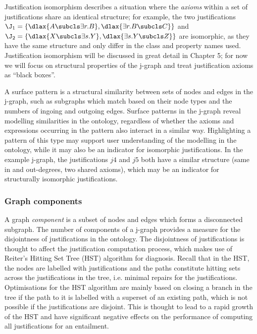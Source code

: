 Justification isomorphism \cite{horridge11gj} describes a situation where the \emph{axioms} within a set of justifications share an identical structure; for example, the two justifications $\J_{1} =\{\dlax{A \subcls \exists r.B}, \dlax{\exists r.B \subcls C}\}$ \entails {} and $\J_{2} = \{\dlax{X \subcls \exists s.Y}, \dlax{\exists s.Y \subcls Z}\}$ \entails {}  are isomorphic, as they have the same structure and only differ in the class and property names used. Justification isomorphism will be discussed in great detail in Chapter 5; for now we will focus on structural properties of the j-graph and treat justification axioms as \enquote{black boxes}.

A surface pattern is a structural similarity between sets of nodes and edges in the j-graph, such as subgraphs which match based on their node types and the numbers of ingoing and outgoing edges. Surface patterns in the j-graph reveal modelling similarities in the ontology, regardless of whether the axioms and expressions occurring in the pattern also interact in a similar way. Highlighting a pattern of this type may support user understanding of the modelling in the ontology, while it may also be an indicator for isomorphic justifications. In the example j-graph, the justifications $j4$ and $j5$ both have a similar structure (same in and out-degrees, two shared axioms), which may be an indicator for structurally isomorphic justifications.


\subsubsection{Graph components} 

A graph \emph{component} is a subset of nodes and edges which forms a disconnected subgraph. The number of components of a j-graph provides a measure for the disjointness of justifications in the ontology. The disjointness of justifications is thought to affect the justification computation process, which makes use of Reiter's Hitting Set Tree (HST) algorithm \cite{reiter87pb} for diagnosis. Recall that in the HST, the nodes are labelled with justifications and the paths constitute hitting sets across the justifications in the tree, i.e. minimal repairs for the justifications. Optimisations for the HST algorithm are mainly based on closing a branch in the tree if the path to it is labelled with a superset of an existing path, which is not possible if the justifications are disjoint. This is thought to lead to a rapid growth of the HST and have significant negative effects on the performance of computing all justifications for an entailment.

